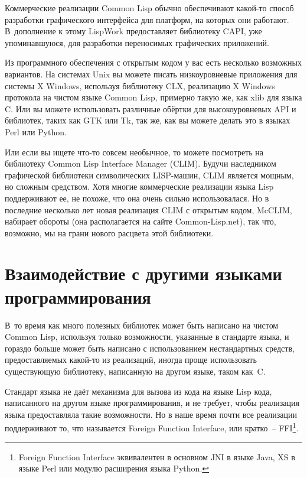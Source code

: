 Коммерческие реализации Common Lisp обычно обеспечивают какой-то способ разработки
графического интерфейса для платформ, на которых они работают. В~дополнение к этому
LispWork предоставляет библиотеку CAPI, уже упоминавшуюся, для разработки переносимых
графических приложений.

Из программного обеспечения с открытым кодом у вас есть несколько возможных вариантов. На
системах Unix вы можете писать низкоуровневые приложения для системы X Windows, используя
библиотеку CLX, реализацию X Windows протокола на чистом языке Common Lisp, примерно такую
же, как xlib для языка C. Или вы можете использовать различные обёртки для высокоуровневых
API и библиотек, таких как GTK или Tk, так же, как вы можете делать это в языках Perl или
Python.

Или если вы ищете что-то совсем необычное, то можете посмотреть на библиотеку Common
Lisp Interface Manager (CLIM). Будучи наследником графической библиотеки символических
LISP-машин, CLIM является мощным, но сложным средством. Хотя многие коммерческие
реализации языка Lisp поддерживают ее, не похоже, что она очень сильно использовалася. Но в
последние несколько лет новая реализация CLIM с открытым кодом, McCLIM, набирает обороты
(она располагается на сайте Common-Lisp.net), так что, возможно, мы на грани нового расцвета
этой библиотеки.

\section{Взаимодействие с другими языками программирования}

В~то время как много полезных библиотек может быть написано на чистом Common Lisp,
используя только возможности, указанные в стандарте языка, и гораздо больше может быть
написано с использованием нестандартных средств, предоставляемых какой-то из реализаций,
иногда проще использовать существующую библиотеку, написанную на другом языке, таком
как~C.

Стандарт языка не даёт механизма для вызова из кода на языке Lisp кода, написанного на
другом языке программирования, и не требует, чтобы реализация языка предоставляла такие
возможности. Но в наше время почти все реализации поддерживают то, что называется Foreign
Function Interface, или кратко~-- FFI\footnote{Foreign Function Interface эквивалентен в
  основном JNI в языке Java, XS в языке Perl или модулю расширения языка Python.}.

